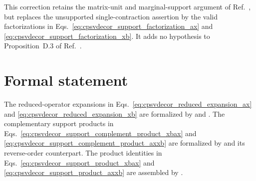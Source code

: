 \documentclass{article}
\begin{document}
This correction retains the matrix-unit and marginal-support argument of
Ref.~\cite{Cirac2016MPDO_arXiv}, but replaces the unsupported
single-contraction assertion by the valid factorizations in
Eqs.~\ref{eq:cpsvdecor_support_factorization_ax} and
\ref{eq:cpsvdecor_support_factorization_xb}. It adds no hypothesis to
Proposition~D.3 of Ref.~\cite{Cirac2016MPDO_arXiv}.

\section{Formal statement}

The reduced-operator expansions in
Eqs.~\ref{eq:cpsvdecor_reduced_expansion_ax} and
\ref{eq:cpsvdecor_reduced_expansion_xb} are formalized by
 and
. The complementary
support products in
Eqs.~\ref{eq:cpsvdecor_support_complement_product_xbax} and
\ref{eq:cpsvdecor_support_complement_product_axxb} are formalized by
\hspace{0pt} and its reverse-order
counterpart. The product identities in
Eqs.~\ref{eq:cpsvdecor_support_product_xbax} and
\ref{eq:cpsvdecor_support_product_axxb} are assembled by
.



\end{document}
